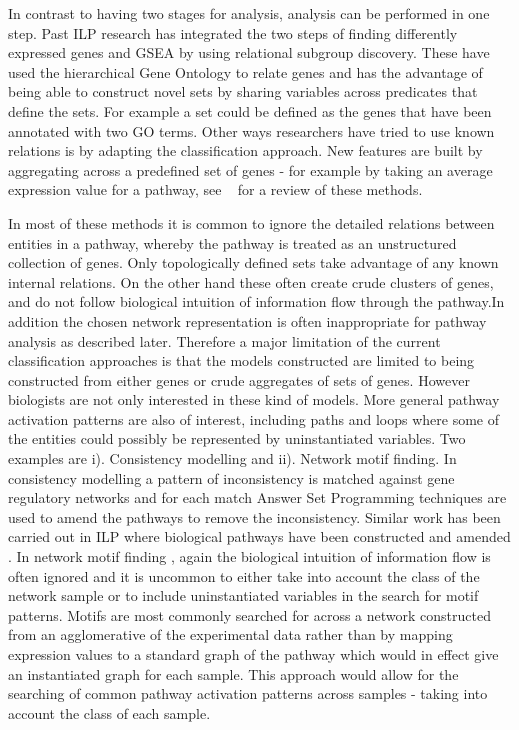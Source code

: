 \documentclass[runningheads,a4paper]{llncs}
\begin{document}
In contrast to having two stages for analysis, analysis can be performed in one step. Past ILP research \citep{gamberger_induction_2004} has integrated the two steps of finding differently expressed genes and GSEA by using relational subgroup discovery. These have used the hierarchical Gene Ontology to relate genes and has the advantage of being able to construct novel sets by sharing variables across predicates that define the sets. For example a set could be defined as the genes that have been annotated with two GO terms.  Other ways researchers have tried to use known relations is by adapting the classification approach. New features are built by aggregating across a predefined set of genes - for example by taking an average expression value for a pathway, see ~\citep{holec_comparative_2012} for a review of these methods.

In most of these methods it is common to ignore the detailed relations between entities in a pathway, whereby the pathway is treated as an unstructured collection of genes. Only topologically defined sets take advantage of any known internal relations. On the other hand these often create crude clusters of genes, and do not follow biological intuition of information flow through the pathway.In addition the chosen network representation is often inappropriate for pathway analysis as described later. Therefore a major limitation of the current classification approaches is that the models constructed are limited to being constructed from either genes or crude aggregates of sets of genes. However biologists are not only interested in these kind of models. More general pathway activation patterns are also of interest, including paths and loops where some of the entities could possibly be represented by uninstantiated variables. Two examples are i). Consistency modelling and ii). Network motif finding. In consistency modelling \citep{guziolowski2010analysis} a pattern of inconsistency is matched against gene regulatory networks and for each match Answer Set Programming techniques are used to amend the pathways to remove the inconsistency. Similar work has been carried out in ILP  where biological pathways have been constructed and amended \citep{ray2010automatic}. In network motif finding \citep{kim_biological_2011}, again the biological intuition of information flow is often ignored and it is uncommon to either take into account the class of the network sample or to include uninstantiated variables in the search for motif patterns. Motifs are most commonly searched for across a network constructed from an agglomerative of the experimental data rather than by mapping expression values to a standard graph of the pathway which would in effect give an instantiated graph for each sample. This approach would allow for the searching of common pathway activation patterns across samples - taking into account the class of each sample. 
\end{document}
